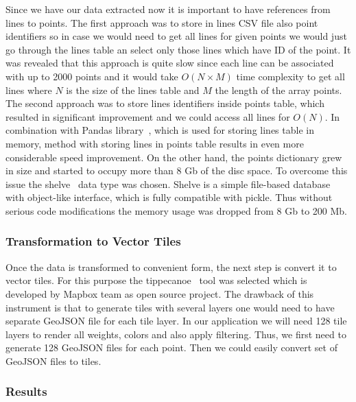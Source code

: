 Since we have our data extracted now it is important to have references from lines to points.
The first approach was to store in lines CSV file also point identifiers so in case we would need
to get all lines for given points we would just go through the lines table an select only those
lines which have ID of the point. It was revealed that this approach is quite slow since each
line can be associated with up to 2000 points and it would take $O(N \times M)$ time complexity
to get all lines where $N$ is the size of the lines table and $M$ the length of the array
points. The second approach was to store lines identifiers inside points table, which
resulted in significant improvement and we could access all lines for $O(N)$. In combination
with Pandas library~\cite{pandas}, which is used for storing lines table in memory, method with
storing lines in points table results in even more considerable speed improvement. On the other
hand, the points dictionary grew in size and started to occupy more than 8 Gb of the disc space.
To overcome this issue the shelve~\cite{shelve} data type was chosen. Shelve is a simple file-based
database with object-like interface, which is fully compatible with pickle. Thus without
serious code modifications the memory usage was dropped from 8 Gb to 200 Mb.

\subsubsection{Transformation to Vector Tiles}

Once the data is transformed to convenient form, the next step is convert it to vector tiles.
For this purpose the tippecanoe~\cite{tippecanoe} tool was selected which is developed by Mapbox team
as open source project. The drawback of this instrument is that to generate tiles with several
layers one would need to have separate GeoJSON file for each tile layer. In our application we will
need 128 tile layers to render all weights, colors and also apply filtering. Thus, we first need to
generate 128 GeoJSON files for each point. Then we could easily convert set of GeoJSON files to
tiles.

\subsubsection{Results}

